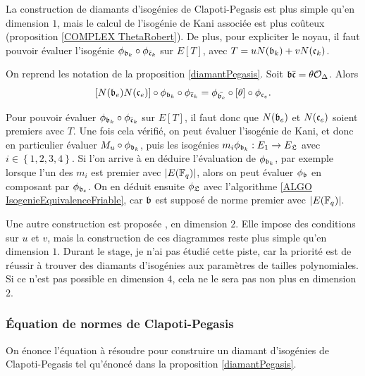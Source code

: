 La construction de diamants d'isogénies de Clapoti-Pegasis est plus simple qu'en dimension $1$, mais le calcul de l'isogénie de Kani associée est plus coûteux (proposition \ref{COMPLEX ThetaRobert}). De plus, pour expliciter le noyau, il faut pouvoir évaluer l'isogénie $\phi_{\mathfrak{b}_k}\circ\phi_{\bar{\mathfrak{c}}_k}$ sur $E[T]$, avec $T = uN(\mathfrak{b}_k) + vN(\mathfrak{c}_k)$.

\begin{Prop}On reprend les notation de la proposition \ref{diamantPegasis}. Soit $\mathfrak{b}\bar{\mathfrak{c}} = \theta\mathcal{O}_{\Delta}$. Alors
	\begin{equation*}
		\left[ N(\mathfrak{b}_e)N(\mathfrak{c}_e)\right] \circ\phi_{\mathfrak{b}_k}\circ\phi_{\bar{\mathfrak{c}}_k} = \phi_{\bar{\mathfrak{b}_e}}\circ[\theta]\circ\phi_{\mathfrak{c}_e}.
	\end{equation*}
\end{Prop}

Pour pouvoir évaluer $\phi_{\mathfrak{b}_k}\circ\phi_{\bar{\mathfrak{c}}_k}$ sur $E[T]$, il faut donc que $N(\mathfrak{b}_e)$ et $N(\mathfrak{c}_e)$ soient premiers avec $T$. Une fois cela vérifié, on peut évaluer l'isogénie de Kani, et donc en particulier évaluer $M_u\circ\phi_{\mathfrak{b}_k}$, puis les isogénies $m_i\phi_{\mathfrak{b}_k} : E_1 \rightarrow E_{\mathfrak{L}}$ avec $i\in\left\lbrace 1,2,3,4\right\rbrace$. Si l'on arrive à en déduire l'évaluation de $\phi_{\mathfrak{b}_k}$, par exemple lorsque l'un des $m_i$ est premier avec $|E(\mathbb{F}_{q})|$, alors on peut évaluer $\phi_{\mathfrak{b}}$ en composant par $\phi_{\mathfrak{b}_e}$. On en déduit ensuite $\phi_{\mathfrak{L}}$ avec l'algorithme \ref{ALGO IsogenieEquivalenceFriable}, car $\mathfrak{b}$ est supposé de norme premier avec $|E(\mathbb{F}_{q})|$. 

\begin{Rem}
	Une autre construction est proposée \cite{Pegasis}, en dimension $2$. Elle impose des conditions sur $u$ et $v$, mais la construction de ces diagrammes reste plus simple qu'en dimension $1$. Durant le stage, je n'ai pas étudié cette piste, car la priorité est de réussir à trouver des diamants d'isogénies aux paramètres de tailles polynomiales. Si ce n'est pas possible en dimension $4$, cela ne le sera pas non plus en dimension $2$. 
\end{Rem}

\subsubsection{Équation de normes de Clapoti-Pegasis}

On énonce l'équation à résoudre pour construire un diamant d'isogénies de Clapoti-Pegasis tel qu'énoncé dans la proposition \ref{diamantPegasis}.

